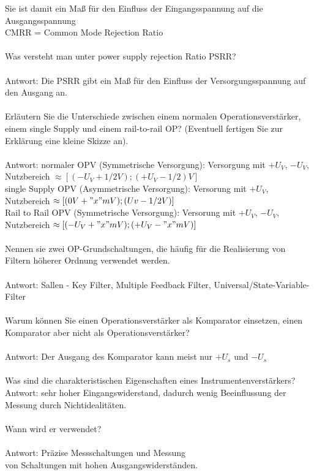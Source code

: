 \documentclass[A4]{scrartcl}
\begin{document}
  Sie ist damit ein Maß für den Einfluss der Eingangsspannung auf die Ausgangsspannung\\
  CMRR = Common Mode Rejection Ratio\\\\
  Was versteht man unter power supply rejection Ratio PSRR?\\
  \\
  Antwort: Die PSRR gibt ein Maß für den Einfluss der Versorgungsspannung auf den Ausgang an.\\\\
  Erläutern Sie die Unterschiede zwischen einem normalen Operationsverstärker, einem single Supply und einem rail-to-rail OP? (Eventuell fertigen Sie zur Erklärung eine kleine Skizze an).\\
  \\
  Antwort: 
  normaler OPV (Symmetrische Versorgung): Versorgung mit $+U_V$, $-U_V$, Nutzbereich $\approx [(-U_V +1/2V); (+U_V -1/2)V]$\\
  single Supply OPV (Asymmetrische Versorgung): Versorung mit $+U_V$, Nutzbereich $\approx [(0V+ "x"mV); (Uv -1/2V)]$ \\
  Rail to Rail OPV (Symmetrische Versorgung): Versorung mit $+U_V$, $-U_V$, Nutzbereich $\approx [(-U_V + "x"mV); (+U_V - "x"mV)]$\\\\
  Nennen sie zwei OP-Grundschaltungen, die häufig für die Realisierung von Filtern höherer Ordnung verwendet werden.\\
  \\
  Antwort: Sallen - Key Filter, Multiple Feedback Filter, Universal/State-Variable-Filter\\\\
  Warum können Sie einen Operationsverstärker als Komparator einsetzen, einen Komparator aber nicht als Operationsverstärker?\\
  \\
  Antwort: Der Ausgang des Komparator kann meist nur $+U_s$ und $-U_s$\\\\
  Was sind die charakteristischen Eigenschaften eines Instrumentenverstärkers?
  \\
  Antwort: sehr hoher Eingangswiderstand, dadurch wenig Beeinflussung der Messung durch Nichtidealitäten.\\\\
  Wann wird er verwendet?\\
  \\
  Antwort: Präzise Messschaltungen und Messung\\ von Schaltungen mit hohen Ausgangswiderständen.\\\\
\end{document}
